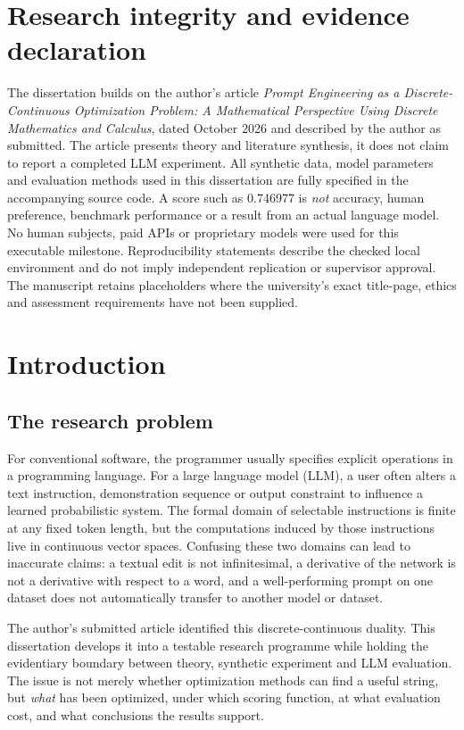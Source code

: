 \documentclass[12pt,a4paper,oneside]{report}
\begin{document}
\chapter*{Research integrity and evidence declaration}
The dissertation builds on the author's article \emph{Prompt Engineering as a Discrete-Continuous Optimization Problem: A Mathematical Perspective Using Discrete Mathematics and Calculus}, dated October 2026 and described by the author as submitted. The article presents theory and literature synthesis, it does not claim to report a completed LLM experiment. All synthetic data, model parameters and evaluation methods used in this dissertation are fully specified in the accompanying source code. A score such as 0.746977 is \emph{not} accuracy, human preference, benchmark performance or a result from an actual language model. No human subjects, paid APIs or proprietary models were used for this executable milestone. Reproducibility statements describe the checked local environment and do not imply independent replication or supervisor approval. The manuscript retains placeholders where the university's exact title-page, ethics and assessment requirements have not been supplied.
\tableofcontents
\listoftables
\listoffigures
\clearpage
{}

\chapter{Introduction}
\section{The research problem}
For conventional software, the programmer usually specifies explicit operations in a programming language. For a large language model (LLM), a user often alters a text instruction, demonstration sequence or output constraint to influence a learned probabilistic system. The formal domain of selectable instructions is finite at any fixed token length, but the computations induced by those instructions live in continuous vector spaces. Confusing these two domains can lead to inaccurate claims: a textual edit is not infinitesimal, a derivative of the network is not a derivative with respect to a word, and a well-performing prompt on one dataset does not automatically transfer to another model or dataset.

The author's submitted article identified this discrete-continuous duality. This dissertation develops it into a testable research programme while holding the evidentiary boundary between theory, synthetic experiment and LLM evaluation. The issue is not merely whether optimization methods can find a useful string, but \emph{what} has been optimized, under which scoring function, at what evaluation cost, and what conclusions the results support.
\end{document}
